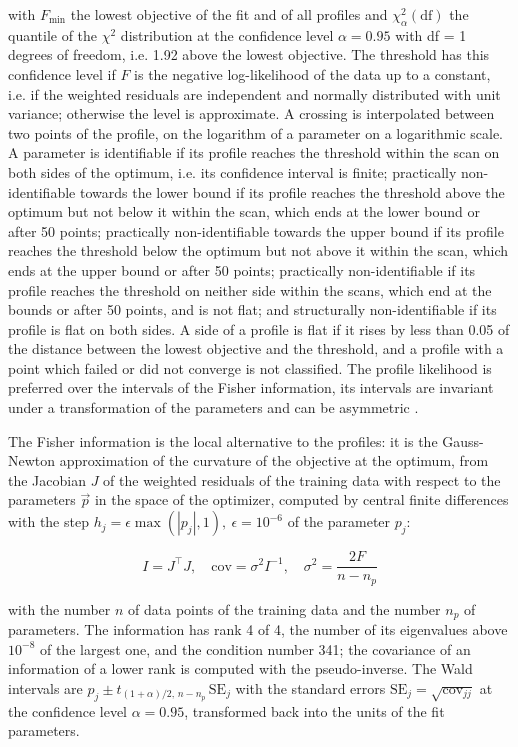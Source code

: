 with $F_{\min}$ the lowest objective of the fit and of all profiles and $\chi^2_{\alpha}(\mathrm{df})$ the quantile of the $\chi^2$ distribution at the confidence level $\alpha = 0.95$ with df = 1 degrees of freedom, i.e. 1.92 above the lowest objective. The threshold has this confidence level if $F$ is the negative log-likelihood of the data up to a constant, i.e. if the weighted residuals are independent and normally distributed with unit variance; otherwise the level is approximate. A crossing is interpolated between two points of the profile, on the logarithm of a parameter on a logarithmic scale. A parameter is identifiable if its profile reaches the threshold within the scan on both sides of the optimum, i.e. its confidence interval is finite; practically non-identifiable towards the lower bound if its profile reaches the threshold above the optimum but not below it within the scan, which ends at the lower bound or after 50 points; practically non-identifiable towards the upper bound if its profile reaches the threshold below the optimum but not above it within the scan, which ends at the upper bound or after 50 points; practically non-identifiable if its profile reaches the threshold on neither side within the scans, which end at the bounds or after 50 points, and is not flat; and structurally non-identifiable if its profile is flat on both sides. A side of a profile is flat if it rises by less than 0.05 of the distance between the lowest objective and the threshold, and a profile with a point which failed or did not converge is not classified. The profile likelihood is preferred over the intervals of the Fisher information, its intervals are invariant under a transformation of the parameters and can be asymmetric \cite{Wieland2021}.

The Fisher information is the local alternative to the profiles: it is the Gauss-Newton approximation of the curvature of the objective at the optimum, from the Jacobian $J$ of the weighted residuals of the training data with respect to the parameters $\vec{p}$ in the space of the optimizer, computed by central finite differences with the step $h_j = \epsilon \max(|p_j|, 1),\ \epsilon = 10^{-6}$ of the parameter $p_j$:

\begin{equation}
I = J^\top J, \quad \mathrm{cov} = \sigma^2 I^{-1}, \quad \sigma^2 = \frac{2 F}{n - n_p}
\end{equation}

with the number $n$ of data points of the training data and the number $n_p$ of parameters. The information has rank 4 of 4, the number of its eigenvalues above $10^{-8}$ of the largest one, and the condition number 341; the covariance of an information of a lower rank is computed with the pseudo-inverse. The Wald intervals are $\hat{p}_j \pm t_{(1+\alpha)/2,\, n-n_p}\, \mathrm{SE}_j$ with the standard errors $\mathrm{SE}_j = \sqrt{\mathrm{cov}_{jj}}$ at the confidence level $\alpha = 0.95$, transformed back into the units of the fit parameters.

